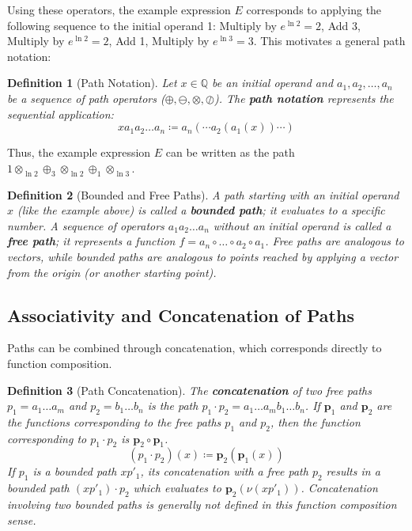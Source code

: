 \documentclass[12pt]{article}
\newtheorem{definition}{Definition}[section]
\begin{document}
Using these operators, the example expression \( E \) corresponds to applying the following sequence to the initial operand 1: Multiply by \( e^{\ln 2} = 2 \), Add 3, Multiply by \( e^{\ln 2} = 2 \), Add 1, Multiply by \( e^{\ln 3} = 3 \). This motivates a general path notation:

\begin{definition}[Path Notation]\label{def:path_notation_cs}
Let \( x \in \mathbb{Q} \) be an initial operand and \( a_1, a_2, \dots, a_n \) be a sequence of path operators (\(\oplus, \ominus, \otimes, \oslash\)). The \textbf{path notation} represents the sequential application:
\[
x a_1 a_2 \dots a_n \coloneqq a_n(\cdots a_2(a_1(x)) \cdots)
\]
\end{definition}
Thus, the example expression \( E \) can be written as the path \( 1 \otimes_{\ln 2} \oplus_3 \otimes_{\ln 2} \oplus_1 \otimes_{\ln 3} \).

\begin{definition}[Bounded and Free Paths]\label{def:bounded_free_paths_cs}
A path starting with an initial operand \( x \) (like the example above) is called a \textbf{bounded path}; it evaluates to a specific number. A sequence of operators \( a_1 a_2 \dots a_n \) without an initial operand is called a \textbf{free path}; it represents a function \( f = a_n \circ \dots \circ a_2 \circ a_1 \). Free paths are analogous to vectors, while bounded paths are analogous to points reached by applying a vector from the origin (or another starting point).
\end{definition}

\subsection{Associativity and Concatenation of Paths} %

Paths can be combined through concatenation, which corresponds directly to function composition.

\begin{definition}[Path Concatenation]\label{def:concatenate_cs}
The \textbf{concatenation} of two free paths \( p_1 = a_1 \dots a_m \) and \( p_2 = b_1 \dots b_n \) is the path \( p_1 \cdot p_2 = a_1 \dots a_m b_1 \dots b_n \). If \( \mathbf{p}_1 \) and \( \mathbf{p}_2 \) are the functions corresponding to the free paths \( p_1 \) and \( p_2 \), then the function corresponding to \( p_1 \cdot p_2 \) is \( \mathbf{p}_2 \circ \mathbf{p}_1 \).
\[
(p_1 \cdot p_2)(x) \coloneqq \mathbf{p}_2(\mathbf{p}_1(x))
\]
If \( p_1 \) is a bounded path \( x p'_1 \), its concatenation with a free path \( p_2 \) results in a bounded path \( (x p'_1) \cdot p_2 \) which evaluates to \( \mathbf{p}_2(\nu(x p'_1)) \). Concatenation involving two bounded paths is generally not defined in this function composition sense.
\end{definition}
\end{document}
